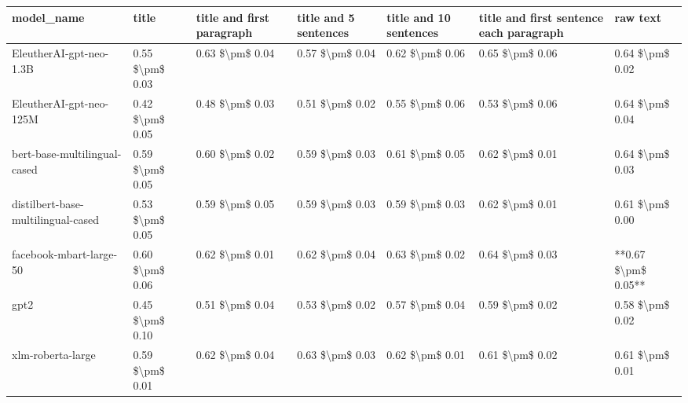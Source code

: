 \begin{tabular}{lllllll}
\toprule
                        model\_name &           title & title and first paragraph & title and 5 sentences & title and 10 sentences & title and first sentence each paragraph &            raw text \\
\midrule
           EleutherAI-gpt-neo-1.3B & 0.55 \$\textbackslash pm\$ 0.03 &           0.63 \$\textbackslash pm\$ 0.04 &       0.57 \$\textbackslash pm\$ 0.04 &        0.62 \$\textbackslash pm\$ 0.06 &                         0.65 \$\textbackslash pm\$ 0.06 &     0.64 \$\textbackslash pm\$ 0.02 \\
           EleutherAI-gpt-neo-125M & 0.42 \$\textbackslash pm\$ 0.05 &           0.48 \$\textbackslash pm\$ 0.03 &       0.51 \$\textbackslash pm\$ 0.02 &        0.55 \$\textbackslash pm\$ 0.06 &                         0.53 \$\textbackslash pm\$ 0.06 &     0.64 \$\textbackslash pm\$ 0.04 \\
      bert-base-multilingual-cased & 0.59 \$\textbackslash pm\$ 0.05 &           0.60 \$\textbackslash pm\$ 0.02 &       0.59 \$\textbackslash pm\$ 0.03 &        0.61 \$\textbackslash pm\$ 0.05 &                         0.62 \$\textbackslash pm\$ 0.01 &     0.64 \$\textbackslash pm\$ 0.03 \\
distilbert-base-multilingual-cased & 0.53 \$\textbackslash pm\$ 0.05 &           0.59 \$\textbackslash pm\$ 0.05 &       0.59 \$\textbackslash pm\$ 0.03 &        0.59 \$\textbackslash pm\$ 0.03 &                         0.62 \$\textbackslash pm\$ 0.01 &     0.61 \$\textbackslash pm\$ 0.00 \\
           facebook-mbart-large-50 & 0.60 \$\textbackslash pm\$ 0.06 &           0.62 \$\textbackslash pm\$ 0.01 &       0.62 \$\textbackslash pm\$ 0.04 &        0.63 \$\textbackslash pm\$ 0.02 &                         0.64 \$\textbackslash pm\$ 0.03 & **0.67 \$\textbackslash pm\$ 0.05** \\
                              gpt2 & 0.45 \$\textbackslash pm\$ 0.10 &           0.51 \$\textbackslash pm\$ 0.04 &       0.53 \$\textbackslash pm\$ 0.02 &        0.57 \$\textbackslash pm\$ 0.04 &                         0.59 \$\textbackslash pm\$ 0.02 &     0.58 \$\textbackslash pm\$ 0.02 \\
                 xlm-roberta-large & 0.59 \$\textbackslash pm\$ 0.01 &           0.62 \$\textbackslash pm\$ 0.04 &       0.63 \$\textbackslash pm\$ 0.03 &        0.62 \$\textbackslash pm\$ 0.01 &                         0.61 \$\textbackslash pm\$ 0.02 &     0.61 \$\textbackslash pm\$ 0.01 \\
\bottomrule
\end{tabular}
